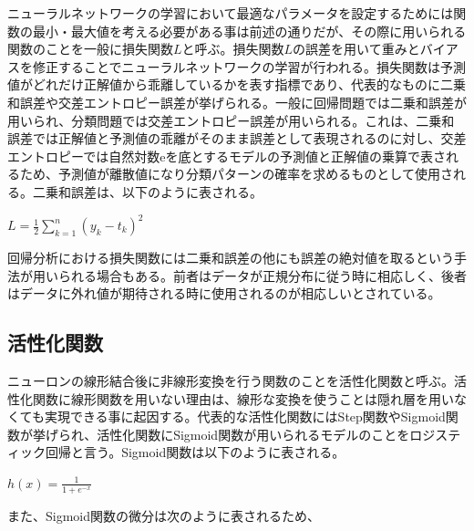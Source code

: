 \documentclass{report}
\begin{document}
ニューラルネットワークの学習において最適なパラメータを設定するためには関数の最小・最大値を考える必要がある事は前述の通りだが、その際に用いられる関数のことを一般に損失関数\begin{math}L\end{math}と呼ぶ。損失関数\begin{math}L\end{math}の誤差を用いて重みとバイアスを修正することでニューラルネットワークの学習が行われる。損失関数は予測値がどれだけ正解値から乖離しているかを表す指標であり、代表的なものに二乗和誤差や交差エントロピー誤差が挙げられる。一般に回帰問題では二乗和誤差が用いられ、分類問題では交差エントロピー誤差が用いられる。これは、二乗和誤差では正解値と予測値の乖離がそのまま誤差として表現されるのに対し、交差エントロピーでは自然対数eを底とするモデルの予測値と正解値の乗算で表されるため、予測値が離散値になり分類パターンの確率を求めるものとして使用される。二乗和誤差は、以下のように表される。


\begin{center}
\begin{math}
L = \frac{1}{2} \sum_{k=1}^{n} (y_k - t_k)^{2}
\end{math}
\end{center}

回帰分析における損失関数には二乗和誤差の他にも誤差の絶対値を取るという手法が用いられる場合もある。前者はデータが正規分布に従う時に相応しく、後者はデータに外れ値が期待される時に使用されるのが相応しいとされている。



\subsection{活性化関数}

ニューロンの線形結合後に非線形変換を行う関数のことを活性化関数と呼ぶ。活性化関数に線形関数を用いない理由は、線形な変換を使うことは隠れ層を用いなくても実現できる事に起因する。代表的な活性化関数にはStep関数やSigmoid関数が挙げられ、活性化関数にSigmoid関数が用いられるモデルのことをロジスティック回帰と言う。Sigmoid関数は以下のように表される。



\begin{center}
\begin{math}
h(x) = \frac{1}{1+e^{-x}} 
\end{math}
\end{center}


また、Sigmoid関数の微分は次のように表されるため、
\end{document}
